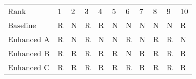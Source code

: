 \begin{tabular}{lllllllllll}
Rank & 1 & 2 & 3 & 4 & 5 & 6 & 7 & 8 & 9 & 10 \\
Baseline & R & N & R & R & N & N & N & N & N & R \\
Enhanced A & R & N & R & N & N & R & N & R & R & N \\
Enhanced B & R & R & R & R & R & N & R & R & R & R \\
Enhanced C & R & R & R & R & R & R & R & R & R & R \\
\end{tabular}
